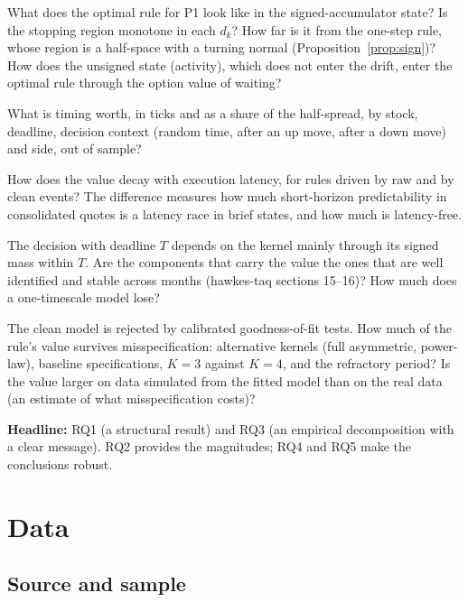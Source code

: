 \documentclass[11pt]{article}
\theoremstyle{definition}
\theoremstyle{remark}
\begin{document}
\begin{description}[leftmargin=0pt]
\item[RQ1 (Structure).] What does the optimal rule for P1 look like in the signed-accumulator state? Is the stopping region monotone in each $d_k$? How far is it from the one-step rule, whose region is a half-space with a turning normal (Proposition~\ref{prop:sign})? How does the unsigned state (activity), which does not enter the drift, enter the optimal rule through the option value of waiting?
\item[RQ2 (Value).] What is timing worth, in ticks and as a share of the half-spread, by stock, deadline, decision context (random time, after an up move, after a down move) and side, out of sample?
\item[RQ3 (Latency).] How does the value decay with execution latency, for rules driven by raw and by clean events? The difference measures how much short-horizon predictability in consolidated quotes is a latency race in brief states, and how much is latency-free.
\item[RQ4 (Which parts of the kernel matter).] The decision with deadline $T$ depends on the kernel mainly through its signed mass within $T$. Are the components that carry the value the ones that are well identified and stable across months (hawkes-taq sections 15--16)? How much does a one-timescale model lose?
\item[RQ5 (Robustness).] The clean model is rejected by calibrated goodness-of-fit tests. How much of the rule's value survives misspecification: alternative kernels (full asymmetric, power-law), baseline specifications, $K = 3$ against $K = 4$, and the refractory period? Is the value larger on data simulated from the fitted model than on the real data (an estimate of what misspecification costs)?
\end{description}

\noindent\textbf{Headline:} RQ1 (a structural result) and RQ3 (an empirical decomposition with a clear message). RQ2 provides the magnitudes; RQ4 and RQ5 make the conclusions robust.

\section{Data}
\label{sec:data}

\subsection{Source and sample}
\end{document}

